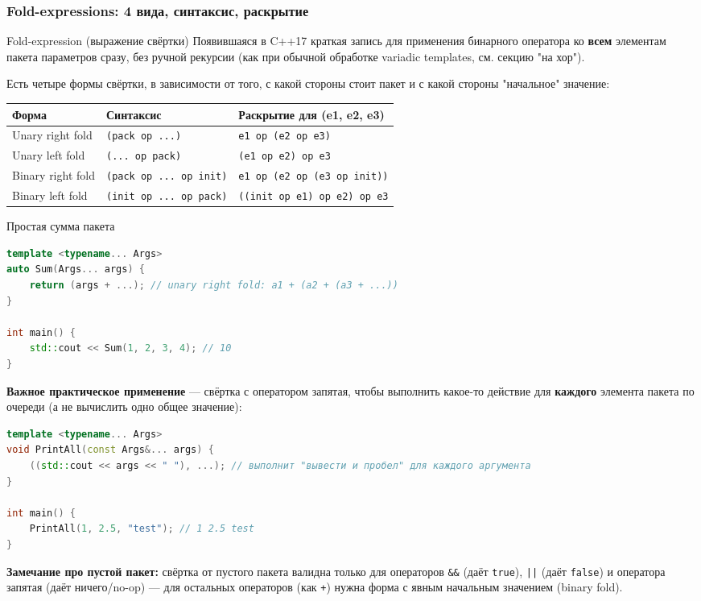 \subsubsection{Fold-expressions: 4 вида, синтаксис, раскрытие}
\begin{definition}{Fold-expression (выражение свёртки)}{}
Появившаяся в C++17 краткая запись для применения бинарного оператора ко \textbf{всем} элементам пакета параметров сразу, без ручной рекурсии (как при обычной обработке variadic templates, см. секцию "на хор").
\end{definition}
Есть четыре формы свёртки, в зависимости от того, с какой стороны стоит пакет и с какой стороны "начальное" значение:
\begin{center}
\begin{tabular}{|l|l|l|}
\hline
\textbf{Форма} & \textbf{Синтаксис} & \textbf{Раскрытие для (e1, e2, e3)} \\
\hline
Unary right fold & \texttt{(pack op ...)} & \texttt{e1 op (e2 op e3)} \\
Unary left fold & \texttt{(... op pack)} & \texttt{(e1 op e2) op e3} \\
Binary right fold & \texttt{(pack op ... op init)} & \texttt{e1 op (e2 op (e3 op init))} \\
Binary left fold & \texttt{(init op ... op pack)} & \texttt{((init op e1) op e2) op e3} \\
\hline
\end{tabular}
\end{center}
\begin{implementation}{Простая сумма пакета}{}
\begin{lstlisting}[language=C++]
template <typename... Args>
auto Sum(Args... args) {
    return (args + ...); // unary right fold: a1 + (a2 + (a3 + ...))
}

int main() {
    std::cout << Sum(1, 2, 3, 4); // 10
}
\end{lstlisting}
\end{implementation}
\textbf{Важное практическое применение} --- свёртка с оператором запятая, чтобы выполнить какое-то действие для \textbf{каждого} элемента пакета по очереди (а не вычислить одно общее значение):
\begin{lstlisting}[language=C++]
template <typename... Args>
void PrintAll(const Args&... args) {
    ((std::cout << args << " "), ...); // выполнит "вывести и пробел" для каждого аргумента
}

int main() {
    PrintAll(1, 2.5, "test"); // 1 2.5 test
}
\end{lstlisting}
\textbf{Замечание про пустой пакет:} свёртка от пустого пакета валидна только для операторов \texttt{\&\&} (даёт \texttt{true}), \texttt{||} (даёт \texttt{false}) и оператора запятая (даёт ничего/no-op) --- для остальных операторов (как \texttt{+}) нужна форма с явным начальным значением (binary fold).
